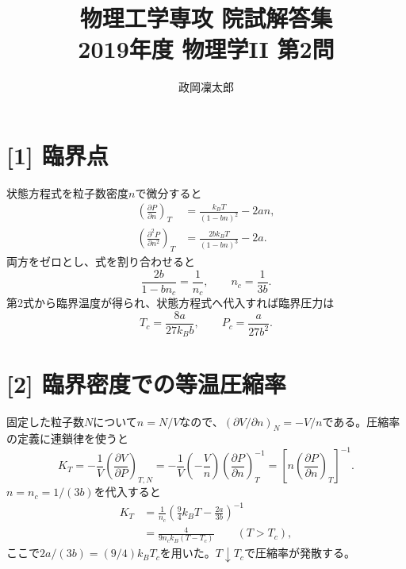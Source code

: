 \documentclass[11pt,a4paper]{article}
\title{物理工学専攻 院試解答集\\2019年度 物理学II 第2問}
\author{政岡凜太郎}
\date{}
\begin{document}
\maketitle

\section*{[1] 臨界点}
状態方程式を粒子数密度$n$で微分すると
\begin{align}
 \left(\frac{\partial P}{\partial n}\right)_T
 &=\frac{k_BT}{(1-bn)^2}-2an,\\
 \left(\frac{\partial^2P}{\partial n^2}\right)_T
 &=\frac{2bk_BT}{(1-bn)^3}-2a.
\end{align}
両方をゼロとし、式を割り合わせると
\begin{equation}
 \frac{2b}{1-bn_c}=\frac1{n_c},\qquad
 \boxed{n_c=\frac1{3b}}.
\end{equation}
第2式から臨界温度が得られ、状態方程式へ代入すれば臨界圧力は
\begin{equation}
 \boxed{T_c=\frac{8a}{27k_Bb}},\qquad
 \boxed{P_c=\frac{a}{27b^2}}.
\end{equation}

\section*{[2] 臨界密度での等温圧縮率}
固定した粒子数$N$について$n=N/V$なので、$(\partial V/\partial n)_N=-V/n$である。圧縮率の定義に連鎖律を使うと
\begin{equation}
 K_T=-\frac1V\left(\frac{\partial V}{\partial P}\right)_{T,N}
 =-\frac1V\left(-\frac Vn\right)
 \left(\frac{\partial P}{\partial n}\right)_T^{-1}
 =\left[n\left(\frac{\partial P}{\partial n}\right)_T\right]^{-1}.
\end{equation}
$n=n_c=1/(3b)$を代入すると
\begin{align}
 K_T&=\frac1{n_c}\left(\frac94k_BT-\frac{2a}{3b}\right)^{-1}\\
 &=\boxed{\frac{4}{9n_ck_B(T-T_c)}}\qquad (T>T_c),
\end{align}
ここで$2a/(3b)=(9/4)k_BT_c$を用いた。$T\downarrow T_c$で圧縮率が発散する。
\end{document}

